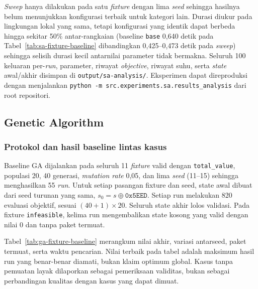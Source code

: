 \textit{Sweep} hanya dilakukan pada satu \textit{fixture} dengan lima \textit{seed} sehingga hasilnya belum menunjukkan konfigurasi terbaik untuk kategori lain. Durasi diukur pada lingkungan lokal yang sama, tetapi konfigurasi yang identik dapat berbeda hingga sekitar 50\% antar-rangkaian (baseline \texttt{base} 0,640 detik pada Tabel~\ref{tab:sa-fixture-baseline} dibandingkan 0,425--0,473 detik pada \textit{sweep}) sehingga selisih durasi kecil antarnilai parameter tidak bermakna. Seluruh 100 keluaran per-\textit{run}, parameter, riwayat \textit{objective}, riwayat suhu, serta \textit{state} awal/akhir disimpan di \texttt{output/sa-analysis/}. Eksperimen dapat direproduksi dengan menjalankan \texttt{python -m src.experiments.sa.results\_analysis} dari root repositori.

\subsection{Genetic Algorithm}

\subsubsection{Protokol dan hasil baseline lintas kasus}

Baseline GA dijalankan pada seluruh 11 \textit{fixture} valid dengan \texttt{total\_value}, populasi 20, 40 generasi, \textit{mutation rate} 0,05, dan lima \textit{seed} (11--15) sehingga menghasilkan 55 \textit{run}. Untuk setiap pasangan fixture dan seed, state awal dibuat dari seed turunan yang sama, $s_0=s\oplus\texttt{0x5EED}$. Setiap run melakukan 820 evaluasi objektif, sesuai $(40+1)\times20$. Seluruh state akhir lolos validasi. Pada fixture \texttt{infeasible}, kelima run mengembalikan state kosong yang valid dengan nilai 0 dan tanpa paket termuat.

Tabel~\ref{tab:ga-fixture-baseline} merangkum nilai akhir, variasi antarseed, paket termuat, serta waktu pencarian. Nilai terbaik pada tabel adalah maksimum hasil run yang benar-benar diamati, bukan klaim optimum global. Kasus tanpa pemuatan layak dilaporkan sebagai pemeriksaan validitas, bukan sebagai perbandingan kualitas dengan kasus yang dapat dimuat.

